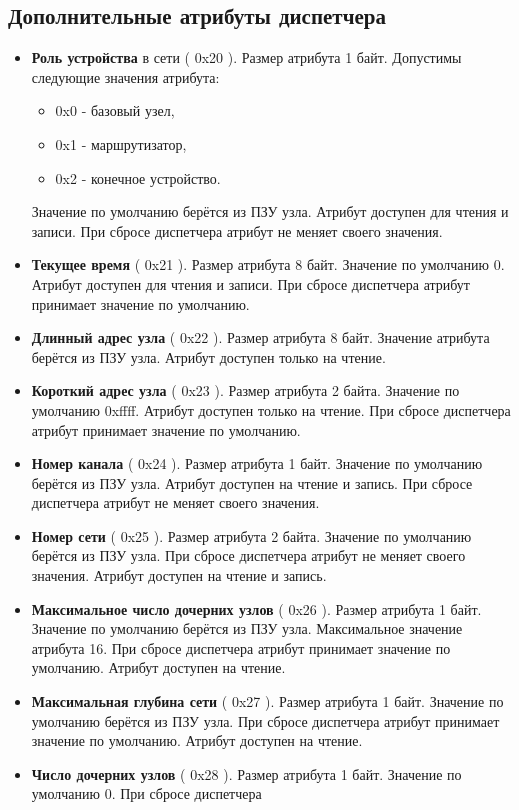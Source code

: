 \subsection{Дополнительные атрибуты диспетчера}
\begin{itemize}
\item {\bfseries Роль устройства} в сети ( 0x20 ). Размер атрибута 1 байт. Допустимы следующие значения атрибута:
    \begin{itemize}
        \item 0x0 - базовый узел,
        \item 0x1 - маршрутизатор,
        \item 0x2 - конечное устройство.
    \end{itemize}
Значение по умолчанию берётся из ПЗУ узла. Атрибут доступен для чтения и записи. 
При сбросе диспетчера атрибут не меняет своего значения.
\item {\bfseries Текущее время} ( 0x21 ). Размер атрибута 8 байт. Значение по умолчанию 0. Атрибут доступен
для чтения и записи. При сбросе диспетчера атрибут принимает значение по умолчанию.
\item {\bfseries Длинный адрес узла} ( 0x22 ). Размер атрибута 8 байт. Значение атрибута берётся из ПЗУ узла.
Атрибут доступен только на чтение.
\item {\bfseries Короткий адрес узла} ( 0x23 ). Размер атрибута 2 байта. Значение по умолчанию 0xffff.
Атрибут доступен только на чтение. При сбросе диспетчера атрибут принимает значение по умолчанию.
\item {\bfseries Номер канала} ( 0x24 ). Размер атрибута 1 байт. Значение по умолчанию берётся из ПЗУ узла.
Атрибут доступен на чтение и запись. При сбросе диспетчера атрибут не меняет своего значения.
\item {\bfseries Номер сети} ( 0x25 ). Размер атрибута 2 байта. Значение по умолчанию берётся из ПЗУ узла.
При сбросе диспетчера атрибут не меняет своего значения. Атрибут доступен на чтение и запись.
\item {\bfseries Максимальное число дочерних узлов} ( 0x26 ). Размер атрибута 1 байт. Значение по умолчанию берётся из
ПЗУ узла. Максимальное значение атрибута 16. При сбросе диспетчера атрибут принимает значение по умолчанию.
Атрибут доступен на чтение.
\item {\bfseries Максимальная глубина сети} ( 0x27 ). Размер атрибута 1 байт. Значение по умолчанию берётся из
ПЗУ узла. При сбросе диспетчера атрибут принимает значение по умолчанию. Атрибут доступен на чтение.
\item {\bfseries Число дочерних узлов} ( 0x28 ). Размер атрибута 1 байт. Значение по умолчанию 0. При сбросе диспетчера

\end{itemize}
